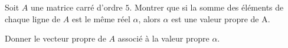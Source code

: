 

\begin{exercice}\label{exoMars20100003}

Soit $A$ une matrice carré d’ordre $5$. Montrer que si la somme des éléments de chaque ligne de $A$ est le même réel $\alpha$, alors $\alpha$ est une valeur propre de A. 

Donner le vecteur propre de $A$ associé à la valeur propre $\alpha$.


\end{exercice}
